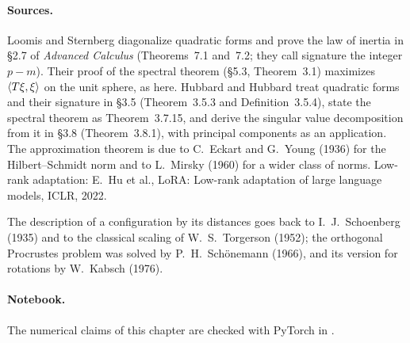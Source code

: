 \begin{notechapter}
\paragraph{Sources.} Loomis and Sternberg diagonalize quadratic forms and
prove the law of inertia in \S2.7 of \emph{Advanced Calculus}
(Theorems~7.1 and~7.2; they call signature the integer $p - m$). Their
proof of the spectral theorem (\S5.3, Theorem~3.1) maximizes
$\left\langle T\xi, \xi \right\rangle$ on the unit sphere, as here. Hubbard and Hubbard treat
quadratic forms and their signature in \S3.5 (Theorem~3.5.3 and
Definition~3.5.4), state the spectral theorem as Theorem~3.7.15, and
derive the singular value decomposition from it in \S3.8 (Theorem~3.8.1),
with principal components as an application. The approximation theorem is
due to C.~Eckart and G.~Young (1936) for the Hilbert--Schmidt norm and to
L.~Mirsky (1960) for a wider class of norms. Low-rank adaptation:
E.~Hu et al., LoRA: Low-rank adaptation of large language models, ICLR,
2022.

The description of a configuration by its distances goes back to
I.~J.~Schoenberg (1935) and to the classical scaling of
W.~S.~Torgerson (1952); the orthogonal Procrustes problem was solved by
P.~H.~Sch\"onemann (1966), and its version for rotations by W.~Kabsch
(1976).

\paragraph{Notebook.} The numerical claims of this chapter are checked
with PyTorch in .


\end{notechapter}
